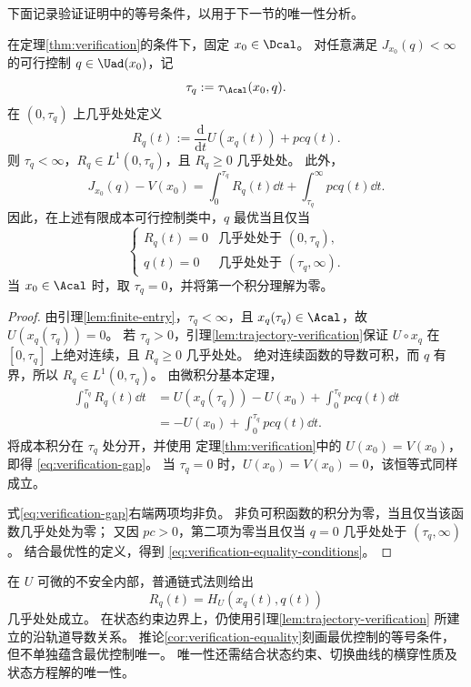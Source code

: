 下面记录验证证明中的等号条件，以用于下一节的唯一性分析。

\begin{corollary}[验证等号条件]
\label{cor:verification-equality}
在定理\ref{thm:verification}的条件下，固定 $x_0\in\Dcal$。
对任意满足 $J_{x_0}(q)<\infty$ 的可行控制 $q\in\Uad(x_0)$，记
\[
\tau_q:=\tau_{\Acal}(x_0,q).
\]
在 $(0,\tau_q)$ 上几乎处处定义
\begin{equation}
R_q(t):=\frac{\mathrm d}{\mathrm d t}U(x_q(t))+pcq(t).
\label{eq:trajectory-verification-residual}
\end{equation}
则 $\tau_q<\infty$，$R_q\in L^1(0,\tau_q)$，且 $R_q\ge0$ 几乎处处。
此外，
\begin{equation}
J_{x_0}(q)-V(x_0)
=
\int_0^{\tau_q}R_q(t)\dd t
+
\int_{\tau_q}^{\infty}pcq(t)\dd t.
\label{eq:verification-gap}
\end{equation}
因此，在上述有限成本可行控制类中，$q$ 最优当且仅当
\begin{equation}
\begin{cases}
R_q(t)=0 & \text{几乎处处于 }(0,\tau_q),\\
q(t)=0 & \text{几乎处处于 }(\tau_q,\infty).
\end{cases}
\label{eq:verification-equality-conditions}
\end{equation}
当 $x_0\in\Acal$ 时，取 $\tau_q=0$，并将第一个积分理解为零。
\end{corollary}

\begin{proof}
由引理\ref{lem:finite-entry}，$\tau_q<\infty$，且
$x_q(\tau_q)\in\Acal$，故 $U(x_q(\tau_q))=0$。
若 $\tau_q>0$，引理\ref{lem:trajectory-verification}保证
$U\circ x_q$ 在 $[0,\tau_q]$ 上绝对连续，且 $R_q\ge0$ 几乎处处。
绝对连续函数的导数可积，而 $q$ 有界，所以
$R_q\in L^1(0,\tau_q)$。
由微积分基本定理，
\begin{align*}
\int_0^{\tau_q}R_q(t)\dd t
&=U(x_q(\tau_q))-U(x_0)
  +\int_0^{\tau_q}pcq(t)\dd t\\
&=-U(x_0)+\int_0^{\tau_q}pcq(t)\dd t.
\end{align*}
将成本积分在 $\tau_q$ 处分开，并使用
定理\ref{thm:verification}中的 $U(x_0)=V(x_0)$，
即得 \eqref{eq:verification-gap}。
当 $\tau_q=0$ 时，$U(x_0)=V(x_0)=0$，该恒等式同样成立。

式\eqref{eq:verification-gap}右端两项均非负。
非负可积函数的积分为零，当且仅当该函数几乎处处为零；
又因 $pc>0$，第二项为零当且仅当 $q=0$ 几乎处处于
$(\tau_q,\infty)$。
结合最优性的定义，得到 \eqref{eq:verification-equality-conditions}。
\end{proof}

\begin{remark}[等号条件与唯一性]
\label{rem:verification-equality-uniqueness}
在 $U$ 可微的不安全内部，普通链式法则给出
\[
R_q(t)=H_U(x_q(t),q(t))
\]
几乎处处成立。
在状态约束边界上，仍使用引理\ref{lem:trajectory-verification}
所建立的沿轨道导数关系。
推论\ref{cor:verification-equality}刻画最优控制的等号条件，
但不单独蕴含最优控制唯一。
唯一性还需结合状态约束、切换曲线的横穿性质及状态方程解的唯一性。
\end{remark}
